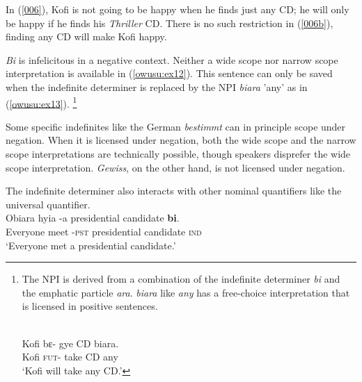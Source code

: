 \documentclass[output=paper,modfonts,nonflat,draftmode]{langsci/langscibook}
\begin{document}
In (\ref{006}), Kofi is not going to be happy when he finds just any CD; he will only be happy if he finds his \emph{Thriller} CD. There is no such restriction in (\ref{006b}), finding any CD will make Kofi happy.

\emph{Bi} is infelicitous in a negative context. Neither a wide scope nor narrow scope interpretation is available in (\ref{owusu:ex12}). This sentence can only be saved when the indefinite determiner is replaced by the NPI \emph{biara} 'any' as in (\ref{owusu:ex13}). \footnote{The NPI is derived from a combination of the indefinite determiner \emph{bi} and the emphatic particle \emph{ara}. \emph{biara} like \emph{any} has a free-choice interpretation that is licensed in positive sentences.

\ea
{}\\
\label{owusu:ex120}
\gll  Kofi  bε- gye CD biara.\\
Kofi \textsc{fut}-  take CD any \\
\glt `Kofi will take any CD.'
\z 
}  
\ea
{}\\


\z \z 

Some specific indefinites like the German \emph{bestimmt} can in principle scope under negation. When it is licensed under negation, both the wide scope and the narrow scope interpretations are technically possible, though speakers disprefer the wide scope interpretation. \emph{Gewiss}, on the other hand, is not licensed under negation.

The indefinite determiner also interacts with other nominal quantifiers like the universal quantifier. 
\ea 
{}\\
  \ea\label{owusu:ex100}
\gll Obiara hyia -a presidential candidate  \textbf{bi}. \\
    Everyone meet -\textsc{pst} presidential candidate \textsc{ind} \\
\glt `Everyone met a presidential candidate.'
\end{document}

